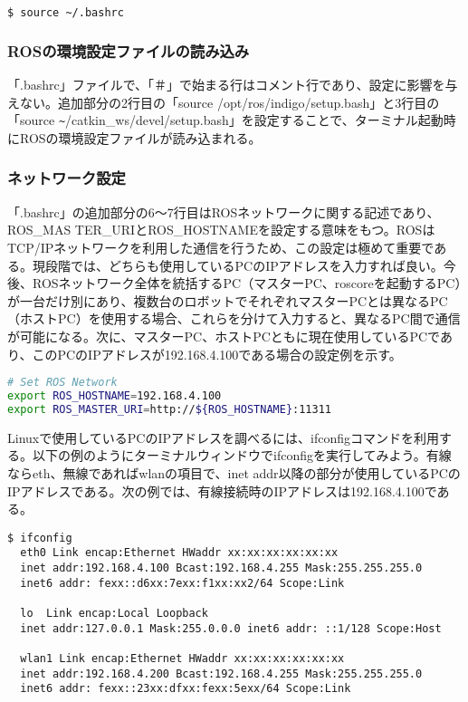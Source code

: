 \begin{lstlisting}[language=bash]
$ source ~/.bashrc
\end{lstlisting}

\subsubsection{ROSの環境設定ファイルの読み込み}

「.bashrc」ファイルで、「＃」で始まる行はコメント行であり、設定に影響を与えない。追加部分の2行目の「source /opt/ros/indigo/setup.bash」と3行目の「source \verb|~|/catkin\_ws/devel/setup.bash」を設定することで、ターミナル起動時にROSの環境設定ファイルが読み込まれる。

\subsubsection{ネットワーク設定}

「.bashrc」の追加部分の6～7行目はROSネットワークに関する記述であり、ROS\_MAS TER\_URIとROS\_HOSTNAMEを設定する意味をもつ。ROSはTCP/IPネットワークを利用した通信を行うため、この設定は極めて重要である。現段階では、どちらも使用しているPCのIPアドレスを入力すれば良い。今後、ROSネットワーク全体を統括するPC（マスターPC、roscoreを起動するPC）が一台だけ別にあり、複数台のロボットでそれぞれマスターPCとは異なるPC（ホストPC）を使用する場合、これらを分けて入力すると、異なるPC間で通信が可能になる。次に、マスターPC、ホストPCともに現在使用しているPCであり、このPCのIPアドレスが192.168.4.100である場合の設定例を示す。

\begin{lstlisting}[language=bash]
# Set ROS Network
export ROS_HOSTNAME=192.168.4.100
export ROS_MASTER_URI=http://${ROS_HOSTNAME}:11311
\end{lstlisting}

\begin{exercise}[ifconfig]
  Linuxで使用しているPCのIPアドレスを調べるには、ifconfigコマンドを利用する。以下の例のようにターミナルウィンドウでifconfigを実行してみよう。有線ならeth、無線であればwlanの項目で、inet addr以降の部分が使用しているPCのIPアドレスである。次の例では、有線接続時のIPアドレスは192.168.4.100である。
  \begin{lstlisting}[language=ROS, backgroundcolor=\color{ocre!10}, numbers=none]
  $ ifconfig
  eth0 Link encap:Ethernet HWaddr xx:xx:xx:xx:xx:xx
  inet addr:192.168.4.100 Bcast:192.168.4.255 Mask:255.255.255.0
  inet6 addr: fexx::d6xx:7exx:f1xx:xx2/64 Scope:Link

  lo  Link encap:Local Loopback
  inet addr:127.0.0.1 Mask:255.0.0.0 inet6 addr: ::1/128 Scope:Host

  wlan1 Link encap:Ethernet HWaddr xx:xx:xx:xx:xx:xx
  inet addr:192.168.4.200 Bcast:192.168.4.255 Mask:255.255.255.0
  inet6 addr: fexx::23xx:dfxx:fexx:5exx/64 Scope:Link
  \end{lstlisting}
\end{exercise}

